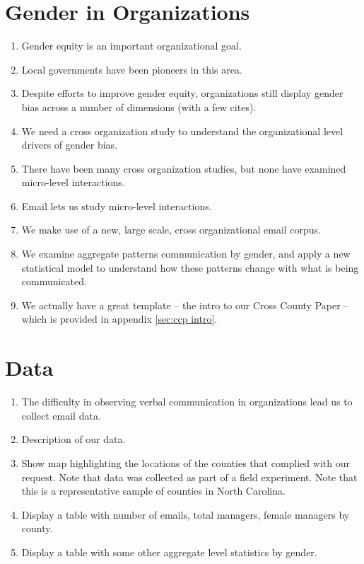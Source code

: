 \documentclass[fleqn]{MJDArticle}
\begin{document}

\section{Gender in Organizations}

\begin{enumerate}
	\item Gender equity is an important organizational goal.
	\item Local governments have been pioneers in this area.
	\item Despite efforts to improve gender equity, organizations still display gender bias across a number of dimensions (with a few cites). 
	\item We need a cross organization study to understand the organizational level drivers of gender bias.
	\item There have been many cross organization studies, but none have examined micro-level interactions.
	\item Email lets us study micro-level interactions.
	\item We make use of a new, large scale, cross organizational email corpus. 
	\item We examine aggregate patterns communication by gender, and apply a new statistical model to understand how these patterns change with what is being communicated.
	\item We actually have a great template -- the intro to our Cross County Paper -- which is provided in appendix \ref{sec:ccp intro}.
\end{enumerate}

\section{Data}

\begin{enumerate}
	\item The difficulty in observing verbal communication in organizations lead us to collect email data.
	\item Description of our data.
	\item Show map highlighting the locations of the counties that complied with our request. Note that data was collected as part of a field experiment. Note that this is a representative sample of counties in North Carolina.
	\item Display a table with number of emails, total managers, female managers by county.
	\item Display a table with some other aggregate level statistics by gender. 
\end{enumerate}
\end{document}
